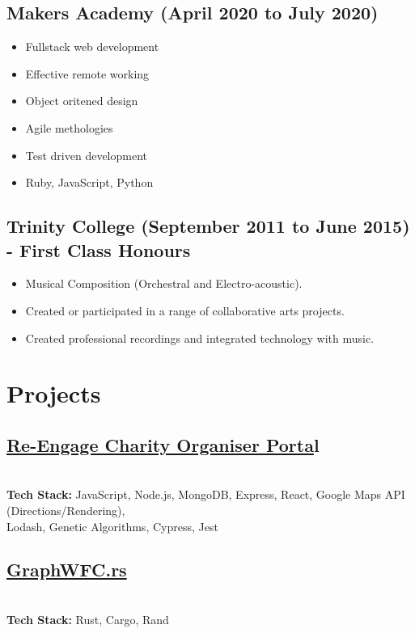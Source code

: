 \documentclass[12pt]{IEEEtran}
\begin{document}
\subsection*{Makers Academy (April 2020 to July 2020)}

\begin{itemize}
\item Fullstack web development
\item Effective remote working
\item Object oritened design
\item Agile methologies
\item Test driven development
\item Ruby, JavaScript, Python
\end{itemize}

\subsection*{Trinity College (September 2011 to June 2015) - First Class Honours}
\begin{itemize}
\item Musical Composition (Orchestral and Electro-acoustic).
\item Created or participated in a range of collaborative arts projects.
\item Created professional recordings and integrated technology with music.
\end{itemize}

\vskip 1in
\lipsum[1-2]
\vfill\null
\columnbreak

\section*{\textbf{Projects}}
\subsection*{\href{https://github.com/Tracht/charity-apr2020}{Re-Engage Charity Organiser Porta}l}
 \\[5pt]
\textbf{Tech Stack:} JavaScript, Node.js, MongoDB, Express, React, Google Maps API (Directions/Rendering), \\ Lodash, Genetic Algorithms, Cypress, Jest

\subsection*{\href{https://github.com/SaiskiFunctions/GraphWFC.rs}{GraphWFC.rs}}
 \\[5pt]
\textbf{Tech Stack:} Rust, Cargo, Rand
\end{document}
